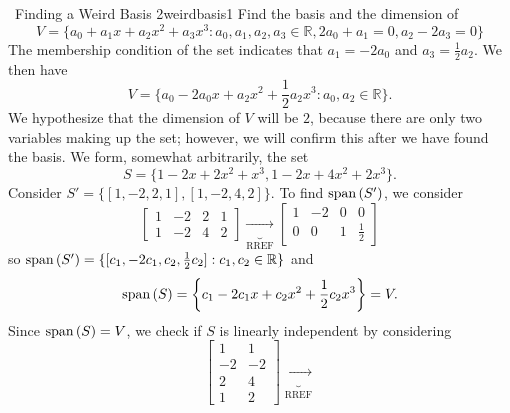 \begin{example}{\Difficulty\,\Difficulty\,\,Finding a Weird Basis 2}{weirdbasis1}
            Find the basis and the dimension of 
            \begin{equation*}
                V=\{a_0+a_1x+a_2x^2+a_3x^3:a_0,a_1,a_2,a_3\in\mathbb{R},2a_0+a_1=0,a_2-2a_3=0\}
            \end{equation*}
            The membership condition of the set indicates that \(a_1=-2a_0\) and \(a_3=\frac{1}{2}a_2\). We then have
            \begin{equation*}
                V=\{a_0-2a_0x+a_2x^2+\frac{1}{2}a_2x^3:a_0,a_2\in\mathbb{R}\}.
            \end{equation*}
            We hypothesize that the dimension of \(V\) will be \(2\), because there are only two variables making up the set; however, we will confirm this after we have found the basis. We form, somewhat arbitrarily, the set
            \begin{equation*}
                S=\{1-2x+2x^2+x^3,1-2x+4x^2+2x^3\}.
            \end{equation*}
            Consider \(S'=\{[1,-2,2,1],[1,-2,4,2]\}\). To find \(\text{span\,}(S')\), we consider
            \begin{equation*}
                \begin{bmatrix}
                    1 & -2 & 2 & 1 \\
                    1 & -2 & 4 & 2
                \end{bmatrix}\underbrace{\to}_{\text{RREF}}
                \begin{bmatrix}
                    1 & -2 & 0 & 0 \\
                    0 & 0 & 1 & \frac{1}{2}
                \end{bmatrix}
            \end{equation*} 
            so \(\text{span\,}(S')=\{[c_1,-2c_1,c_2,\frac{1}{2}c_2]:c_1,c_2\in\mathbb{R}\}\) and 
            \begin{equation*}
                \text{span\,}(S)=\left\{c_1-2c_1x+c_2x^2+\frac{1}{2}c_2x^3\right\}=V.
            \end{equation*}
            Since \(\text{span\,}(S)=V\), we check if \(S\) is linearly independent by considering
            \begin{equation*}
                \begin{bmatrix}
                    1 & 1 \\
                    -2 & -2 \\
                    2 & 4 \\
                    1 & 2
                \end{bmatrix}\underbrace{\to}_{\text{RREF}}

\end{equation*}
\end{example}
